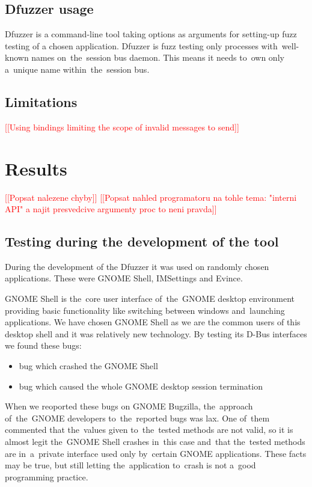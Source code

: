 \documentclass[conference]{IEEEtran}
\newcommand{\addtodo}[1]{\textcolor{red}{[[#1]]}}
\newcommand{\dummytext}{\textcolor{light-gray}{\Blindtext}}
\begin{document}
\subsection{Dfuzzer usage}
Dfuzzer is a command-line tool taking options as arguments for setting-up fuzz
testing of a chosen application. Dfuzzer is fuzz testing only processes
with~well-known names on~the~session bus daemon. This means it needs to~own
only a~unique name within~the~session bus.

\dummytext
\subsection{Limitations}
\addtodo{Using bindings limiting the scope of invalid messages to send}

\section{Results}
\addtodo{Popsat nalezene chyby}
\addtodo{Popsat nahled programatoru na tohle tema: "interni API" a najit presvedcive argumenty proc to neni pravda}
\subsection{Testing during the development of the tool}
During the development of the Dfuzzer it was used on randomly chosen applications.
These were GNOME Shell, IMSettings and Evince.

GNOME Shell is the~core user interface of~the~GNOME desktop environment
providing basic functionality like switching between windows and~launching
applications. We have chosen GNOME Shell as we are the common users of this
desktop shell and it was relatively new technology. By testing its D-Bus
interfaces we found these bugs:
\begin{itemize}
	\item bug which crashed the GNOME Shell
	\item bug which caused the whole GNOME desktop session termination
\end{itemize}
When we reoported these bugs on GNOME Bugzilla, the~approach of~the~GNOME
developers to~the~reported bugs was lax. One of~them commented that the~values
given to~the~tested methods are not valid, so it is almost legit
the~GNOME Shell crashes in~this case and~that the~tested methods are
in~a~private interface used only by~certain GNOME applications. These facts may
be true, but still letting the~application to~crash is not a~good programming
practice.
\end{document}
